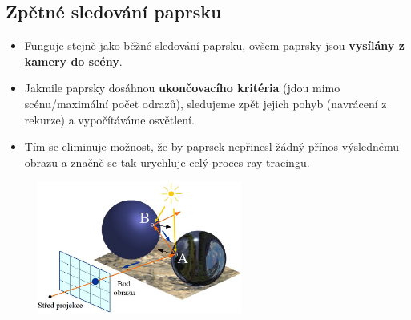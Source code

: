 \subsection{Zpětné sledování paprsku}
\begin{itemize}
 \item Funguje stejně jako běžné sledování paprsku, ovšem paprsky jsou \textbf{vysílány z kamery do scény}.
 \item Jakmile paprsky dosáhnou \textbf{ukončovacího kritéria} (jdou mimo scénu/maximální počet odrazů), sledujeme zpět jejich pohyb (navrácení z rekurze) a vypočítáváme osvětlení.
 \item Tím se eliminuje možnost, že by paprsek nepřinesl žádný přínos výslednému obrazu a značně se tak urychluje celý proces ray tracingu.
\end{itemize}
\begin{figure}[H]
\centering
\includegraphics[width=0.6\textwidth]{assets/6_ray_trace_kamera}
\end{figure}

